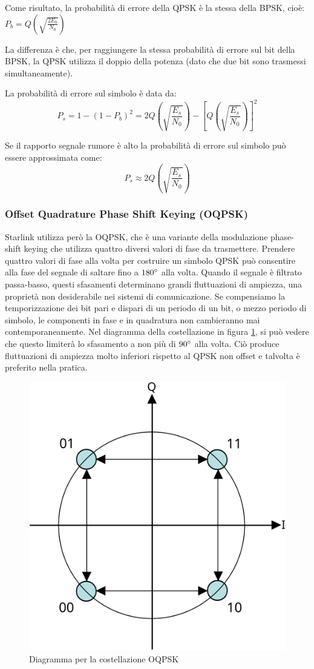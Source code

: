 Come risultato, la probabilità di errore della \ac{QPSK} è la stessa della \ac{BPSK}, cioè: $P_b = Q(\sqrt{\frac{2 E_b}{N_0}})$

La differenza è che, per raggiungere la stessa probabilità di errore sul bit della \ac{BPSK}, la \ac{QPSK} utilizza il doppio della potenza (dato che due bit sono trasmessi simultaneamente).

La probabilità di errore sul simbolo è data da:
$$P_s = 1 - (1-P_b)^2 = 2Q(\sqrt{\frac{E_s}{N_0}}) - [Q(\sqrt{\frac{E_s}{N_0}})]^2$$

Se il rapporto segnale rumore è alto la probabilità di errore sul simbolo può essere approssimata come:
$$P_s \approx 2Q(\sqrt{\frac{E_s}{N_0}})$$

\subsubsection{Offset Quadrature Phase Shift Keying (OQPSK)}
Starlink utilizza però la \ac{OQPSK}, che è una variante della modulazione phase-shift keying che utilizza quattro diversi valori di fase da trasmettere.
Prendere quattro valori di fase alla volta per costruire un simbolo \ac{QPSK} può consentire alla fase del segnale di saltare fino a $180 \degree$ alla volta.
Quando il segnale è filtrato passa-basso, questi sfasamenti determinano grandi fluttuazioni di ampiezza, una proprietà non desiderabile nei sistemi di comunicazione.
Se compensiamo la temporizzazione dei bit pari e dispari di un periodo di un bit, o mezzo periodo di simbolo, le componenti in fase e in quadratura non cambieranno mai contemporaneamente.
Nel diagramma della costellazione in figura \ref{fig:oqpsk-diagram}, si può vedere che questo limiterà lo sfasamento a non più di $90 \degree$ alla volta.
Ciò produce fluttuazioni di ampiezza molto inferiori rispetto al \ac{QPSK} non offset e talvolta è preferito nella pratica.

\begin{figure}[htbp]
  \centering
  \includegraphics[width=0.4\linewidth]{./res/img/oqpsk_diagram.png}
  \caption{Diagramma per la costellazione OQPSK}
  \label{fig:oqpsk-diagram}
\end{figure}

